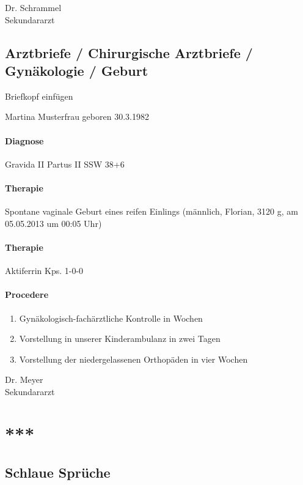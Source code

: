 \documentclass[
ngerman,
paper=a4,
asymmetric,
fontsize=10pt,
draft=false,
numbers=noenddot,
bibtotocnumbered,
footnotes=multiple,
]{scrreprt}
\newcommand{\jNEU}{\vspace{6pt}\noindent{\color{green}\sffamily\textbf{ADDED}\hrulefill\newline}}
\newcommand{\jNEUende}{\newline{\color{green}\rule{\linewidth}{3pt}\newline}}
\begin{document}
Dr. Schrammel\\
Sekundararzt
\jNEUende

\subsection{Arztbriefe / Chirurgische Arztbriefe / Gynäkologie / Geburt}

\jNEU
Briefkopf einfügen

Martina Musterfrau geboren 30.3.1982

\paragraph{Diagnose} Gravida II Partus II SSW 38+6 

\paragraph{Therapie}
Spontane vaginale Geburt eines reifen Einlings (männlich,
Florian, 3120 g, am 05.05.2013 um 00:05 Uhr)

\paragraph{Therapie} 
Aktiferrin Kps. 1-0-0

\paragraph{Procedere} 

\begin{enumerate}
  \item Gynäkologisch-fachärztliche Kontrolle
in  Wochen 
\item 
Vorstellung in unserer Kinderambulanz
in zwei Tagen 
\item 
Vorstellung der niedergelassenen Orthopäden in vier Wochen
\end{enumerate}



Dr. Meyer\\
Sekundararzt 
\jNEUende


\section{***}

\subsection{Schlaue Sprüche}
\end{document}
